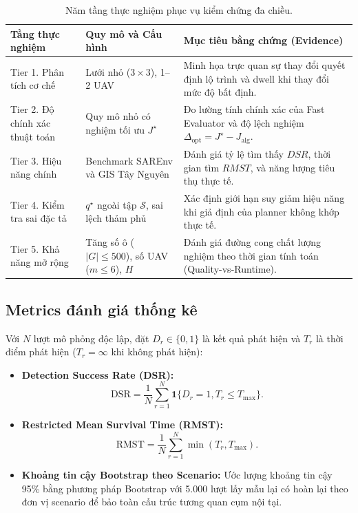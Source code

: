 \documentclass[12pt,a4paper]{article}
\begin{document}
\begin{table}[H]
\centering
\caption{Năm tầng thực nghiệm phục vụ kiểm chứng đa chiều.}
\label{tab:tiers}
\small
\begin{tabular}{@{}p{2.8cm}p{4.7cm}p{6.0cm}@{}}
\toprule
\textbf{Tầng thực nghiệm} & \textbf{Quy mô và Cấu hình} & \textbf{Mục tiêu bằng chứng (Evidence)} \\
\midrule
Tier 1. Phân tích cơ chế &
Lưới nhỏ ($3 \times 3$), 1--2 UAV &
Minh họa trực quan sự thay đổi quyết định lộ trình và dwell khi thay đổi mức độ bất định. \\
Tier 2. Độ chính xác thuật toán &
Quy mô nhỏ có nghiệm tối ưu $J^\star$ &
Đo lường tính chính xác của Fast Evaluator và độ lệch nghiệm $\Delta_{\mathrm{opt}} = J^\star - J_{\mathrm{alg}}$. \\
Tier 3. Hiệu năng chính &
Benchmark SAREnv và GIS Tây Nguyên &
Đánh giá tỷ lệ tìm thấy $DSR$, thời gian tìm $RMST$, và năng lượng tiêu thụ thực tế. \\
Tier 4. Kiểm tra sai đặc tả &
$q^\star$ ngoài tập $\mathcal{S}$, sai lệch thảm phủ &
Xác định giới hạn suy giảm hiệu năng khi giả định của planner không khớp thực tế. \\
Tier 5. Khả năng mở rộng &
Tăng số ô ($|G| \le 500$), số UAV ($m \le 6$), $H$ &
Đánh giá đường cong chất lượng nghiệm theo thời gian tính toán (Quality-vs-Runtime). \\
\bottomrule
\end{tabular}
\end{table}

\subsection{Metrics đánh giá thống kê}

Với $N$ lượt mô phỏng độc lập, đặt $D_r \in \{0, 1\}$ là kết quả phát hiện và $T_r$ là thời điểm phát hiện ($T_r = \infty$ khi không phát hiện):
\begin{itemize}
    \item \textbf{Detection Success Rate (DSR):}
    \begin{equation}
    \mathrm{DSR} = \frac{1}{N}\sum_{r=1}^N \mathbf{1}\{D_r = 1, T_r \leq T_{\max}\}.
    \end{equation}
    \item \textbf{Restricted Mean Survival Time (RMST):}
    \begin{equation}
    \mathrm{RMST} = \frac{1}{N}\sum_{r=1}^N \min(T_r, T_{\max}).
    \end{equation}
    \item \textbf{Khoảng tin cậy Bootstrap theo Scenario:} Ước lượng khoảng tin cậy 95\% bằng phương pháp Bootstrap với 5.000 lượt lấy mẫu lại có hoàn lại theo đơn vị scenario để bảo toàn cấu trúc tương quan cụm nội tại.
\end{itemize}
\end{document}

